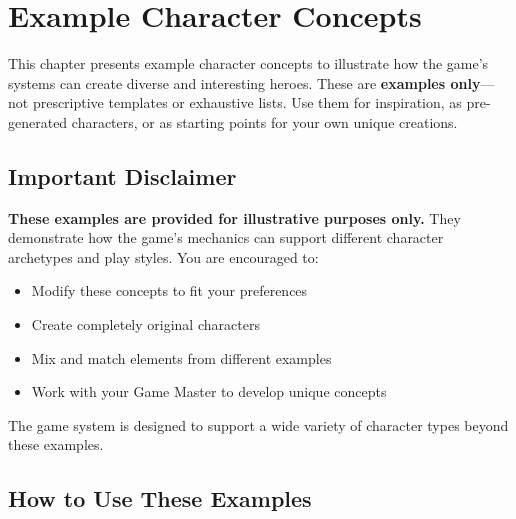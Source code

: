 \chapter{Example Character Concepts}
\label{ch:example-concepts}

This chapter presents example character concepts to illustrate how the game's systems can create diverse and interesting heroes. These are \textbf{examples only}---not prescriptive templates or exhaustive lists. Use them for inspiration, as pre-generated characters, or as starting points for your own unique creations.

\section{Important Disclaimer}
\label{sec:concepts-disclaimer}

\textbf{These examples are provided for illustrative purposes only.} They demonstrate how the game's mechanics can support different character archetypes and play styles. You are encouraged to:
\begin{itemize}
\item Modify these concepts to fit your preferences
\item Create completely original characters
\item Mix and match elements from different examples
\item Work with your Game Master to develop unique concepts
\end{itemize}

The game system is designed to support a wide variety of character types beyond these examples.

\section{How to Use These Examples}
\label{sec:concepts-usage}

